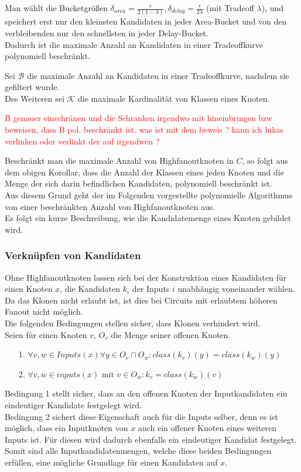 \documentclass[11pt, a4paper, german]{article}
\begin{document}
Man wählt die Bucketgrößen $\delta_{area} = \frac{\epsilon}{2(1-\lambda)}, \delta_{delay} = \frac{\epsilon}{2\lambda}$ (mit Tradeoff $\lambda$), und speichert erst nur den kleinsten Kandidaten in jeder Area-Bucket und von den verbleibenden nur den schnellsten in jeder Delay-Bucket.\\
Dadurch ist die maximale Anzahl an Kandidaten in einer Tradeoffkurve polynomiell beschränkt. 
\begin{definition}
Sei $\mathcal{B}$ die maximale Anzahl an Kandidaten in einer Tradeoffkurve, nachdem sie gefiltert wurde.\\
Des Weiteren sei $\mathcal{K}$ die maximale Kardinalität von Klassen eines Knoten.
\end{definition}
\textcolor{red}{B genauer einschränen und die Schranken irgendwo mit hineinbringen bzw beweisen, dass B pol. beschränkt ist. }
\textcolor{red}{was ist mit dem beweis ? kann ich lukas verlinken oder verlinkt der auf irgendwen ?}

Beschränkt man die maximale Anzahl von Highfanoutknoten in $C$, so folgt aus dem obigen Korollar, dass die Anzahl der Klassen eines jeden Knoten und die Menge der sich darin befindlichen Kandidaten, polynomiell beschränkt ist. \\
Aus diesem Grund geht der im Folgenden vorgestellte polynomielle Algorithmus von einer beschränkten Anzahl von Highfanoutknoten aus.\\ 

Es folgt ein kurze Beschreibung, wie die Kandidatemenge eines Knoten gebildet wird.

\subsubsection{Verknüpfen von Kandidaten}
Ohne Highfanoutknoten lassen sich bei der Konstruktion eines Kandidaten für einen Knoten $x$, die Kandidaten $k_i$ der Inputs $i$ unabhängig voneinander wählen.
Da das Klonen nicht erlaubt ist, ist dies bei Circuits mit erlaubtem höheren Fanout nicht möglich.\\
Die folgenden Bedingungen stellen sicher, dass Klonen verhindert wird. \\
Seien für einen Knoten $v$, $O_v$ die Menge seiner offenen Knoten.
\begin{itemize}
	\item[1.] $\forall v,w \in Inputs(x) \forall y \in O_v \cap O_w : class(k_v)(y) = class(k_w)(y)$
	\item[2.] $\forall v,w \in inputs(x) \text{ mit } v \in O_w : k_v = class(k_w)(v)$
\end{itemize}
Bedingung 1 stellt sicher, dass an den offenen Knoten der Inputkandidaten ein eindeutiger Kandidate festgelegt wird.\\ Bedingung 2 sichert diese Eigenschaft auch für die Inputs selber, denn es ist möglich, dass ein Inputknoten von $x$ auch ein offener Knoten eines weiteren Inputs ist. Für diesen wird dadurch ebenfalls ein eindeutiger Kandidat festgelegt. \\
Somit sind alle Inputkandidatenmengen, welche diese beiden Bedingungen erfüllen, eine mögliche Grundlage für einen Kandidaten auf $x$. 
\end{document}
